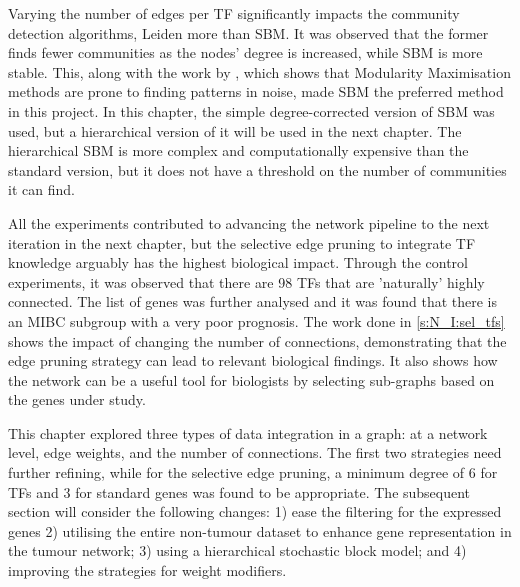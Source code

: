 Varying the number of edges per TF significantly impacts the community detection algorithms, Leiden more than SBM. It was observed that the former finds fewer communities as the nodes' degree is increased, while SBM is more stable. This, along with the work by \citet{Peixoto2021-jx, Peixoto2023-rt}, which shows that Modularity Maximisation methods are prone to finding patterns in noise, made SBM the preferred method in this project. In this chapter, the simple degree-corrected version of SBM was used, but a hierarchical version of it will be used in the next chapter. The hierarchical SBM is more complex and computationally expensive than the standard version, but it does not have a threshold on the number of communities it can find.


All the experiments contributed to advancing the network pipeline to the next iteration in the next chapter, but the selective edge pruning to integrate TF knowledge arguably has the highest biological impact. Through the control experiments, it was observed that there are 98 TFs that are 'naturally' highly connected. The list of genes was further analysed and it was found that there is an MIBC subgroup with a very poor prognosis. The work done in \cref{s:N_I:sel_tfs} shows the impact of changing the number of connections, demonstrating that the edge pruning strategy can lead to relevant biological findings. It also shows how the network can be a useful tool for biologists by selecting sub-graphs based on the genes under study.


This chapter explored three types of data integration in a graph: at a network level, edge weights, and the number of connections. The first two strategies need further refining, while for the selective edge pruning, a minimum degree of 6 for TFs and 3 for standard genes was found to be appropriate. The subsequent section will consider the following changes: 1) ease the filtering for the expressed genes 2) utilising the entire non-tumour dataset to enhance gene representation in the tumour network; 3) using a hierarchical stochastic block model; and 4) improving the strategies for weight modifiers.


